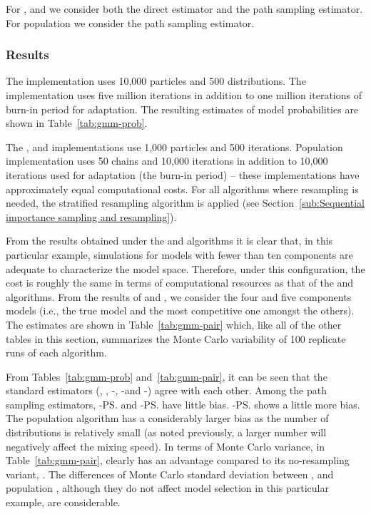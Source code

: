 For \smc[2], \smc[3] and \ais we consider both the direct estimator and the
path sampling estimator. For population \mcmc we consider the path sampling
estimator.

\subsubsection{Results}
\label{sec:gmm_res}

The \smc[1] implementation uses 10,000 particles and 500 distributions. The
\rjmcmc implementation uses five million iterations in addition to one million
iterations of burn-in period for adaptation. The resulting estimates of model
probabilities are shown in Table~\ref{tab:gmm-prob}.

The \smc[2], \smc[3] and \ais implementations use 1,000 particles and 500
iterations. Population \mcmc implementation uses 50 chains and 10,000
iterations in addition to 10,000 iterations used for adaptation (the burn-in
period) -- these implementations have approximately equal computational costs.
For all algorithms where resampling is needed, the stratified resampling
algorithm is applied (see Section~\ref{sub:Sequential importance sampling and
  resampling}).

From the results obtained under the \smc[1] and \rjmcmc algorithms it is clear
that, in this particular example, simulations for models with fewer than ten
components are adequate to characterize the model space. Therefore, under this
configuration, the cost is roughly the same in terms of computational
resources as that of the \smc[1] and \rjmcmc algorithms. From the results of
\rjmcmc and \smc[1], we consider the four and five components models (i.e.,
the true model and the most competitive one amongst the others). The estimates
are shown in Table~\ref{tab:gmm-pair} which, like all of the other tables in
this section, summarizes the Monte Carlo variability of 100 replicate runs of
each algorithm.




From Tables~\ref{tab:gmm-prob} and~\ref{tab:gmm-pair}, it can be seen that the
standard estimators (\rjmcmc, \smc[1], \smc[2]-\ds, \smc[3]-\ds and \ais-\ds)
agree with each other. Among the path sampling estimators, \smc[2]-\ps and
\ais-\ps have little bias. \smc[3]-\ps shows a little more bias. The
population \mcmc algorithm has a considerably larger bias as the number of
distributions is relatively small (as noted previously, a larger number will
negatively affect the mixing speed). In terms of Monte Carlo variance, in
Table~\ref{tab:gmm-pair}, \smc[2] clearly has an advantage compared to its
no-resampling variant, \ais. The differences of Monte Carlo standard deviation
between \smc[2], \smc[3] and population \mcmc, although they do not affect
model selection in this particular example, are considerable.

